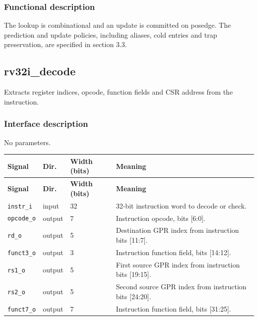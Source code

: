 \documentclass[11pt]{article}
\begin{document}
\subsubsection{Functional description}
\noindent The lookup is combinational and an update is committed on posedge. The prediction and update policies, including aliases, cold entries and trap preservation, are specified in section 3.3.\par\medskip

\subsection{rv32i\_decode}
Extracts register indices, opcode, function fields and CSR address from the instruction.
\subsubsection{Interface description}
\noindent No parameters.\par\medskip
{\small
\begin{longtable}{@{}L{0.3400\dimexpr\linewidth-36pt\relax}L{0.1000\dimexpr\linewidth-36pt\relax}L{0.1000\dimexpr\linewidth-36pt\relax}L{0.4600\dimexpr\linewidth-36pt\relax}@{}}
\toprule
\textbf{Signal} & \textbf{Dir.} & \textbf{Width (bits)} & \textbf{Meaning} \\ \midrule
\endfirsthead
\toprule
\textbf{Signal} & \textbf{Dir.} & \textbf{Width (bits)} & \textbf{Meaning} \\ \midrule
\endhead
\texttt{instr\_i} & input & 32 & 32-bit instruction word to decode or check. \\ \addlinespace[3pt]
\texttt{opcode\_o} & output & 7 & Instruction opcode, bits [6:0]. \\ \addlinespace[3pt]
\texttt{rd\_o} & output & 5 & Destination GPR index from instruction bits [11:7]. \\ \addlinespace[3pt]
\texttt{funct3\_o} & output & 3 & Instruction function field, bits [14:12]. \\ \addlinespace[3pt]
\texttt{rs1\_o} & output & 5 & First source GPR index from instruction bits [19:15]. \\ \addlinespace[3pt]
\texttt{rs2\_o} & output & 5 & Second source GPR index from instruction bits [24:20]. \\ \addlinespace[3pt]
\texttt{funct7\_o} & output & 7 & Instruction function field, bits [31:25]. \\*
\bottomrule\end{longtable}}
\end{document}
